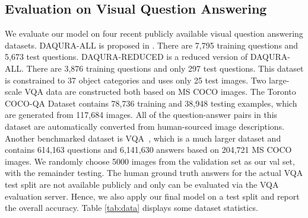 \subsection{Evaluation on Visual Question Answering}
We evaluate our model on four recent publicly available visual question answering datasets.
DAQURA-ALL is proposed in \cite{malinowski2014towards}. There are 7,795 training questions and 5,673 test questions. %
DAQURA-REDUCED is a reduced version of DAQURA-ALL. There are 3,876 training questions and only 297 test questions. This dataset is constrained to 37 object categories and uses only 25 test images. Two large-scale VQA data are constructed both based on MS COCO images. The Toronto COCO-QA Dataset \cite{ren2015image} contains 78,736 training and 38,948 testing examples, which are generated from 117,684 images. %
All of the question-answer pairs in this dataset are automatically converted from human-sourced image descriptions. Another benchmarked dataset is VQA~\cite{antol2015vqa}, which is a much larger dataset and contains 614,163 questions and 6,141,630 answers based on 204,721 MS COCO images. %
We randomly choose 5000 images from the validation set as our val set, with the remainder testing. The human ground truth answers for the actual VQA test split are not available publicly and only can be evaluated via the VQA evaluation server. Hence, we also apply our final model on a test split and report the overall accuracy. Table \ref{tab:data} displays some dataset statistics. %

\begin{table}[h]
\begin{center}
\scriptsize
{}
 \vspace{-3pt}
 \caption{Some statistics about the DAQURA, Toronto COCO-QA Dataset \cite{ren2015image} and VQA dataset~\cite{antol2015vqa}.}
 \label{tab:data}
\end{center}
\end{table}

